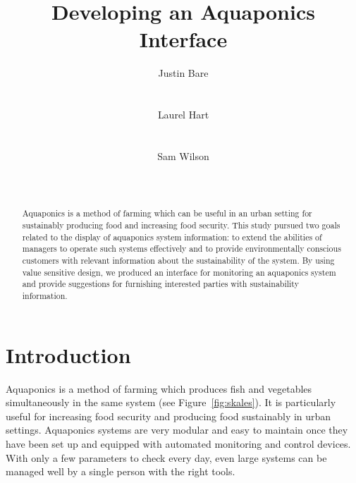 \documentclass{sigchi}
\begin{document}
\title{Developing an Aquaponics Interface}

\author{
  \alignauthor Justin Bare\\
    \\
    \\
  \alignauthor Laurel Hart\\
    \\
    \\
  \alignauthor Sam Wilson\\
    \\
    \\
}

\maketitle

\begin{abstract}
Aquaponics is a method of farming which can be useful in an urban setting for sustainably producing food and increasing food security. This study pursued two goals related to the display of aquaponics system information: to extend the abilities of managers to operate such systems effectively and to provide environmentally conscious customers with relevant information about the sustainability of the system. By using value sensitive design, we produced an interface for monitoring an aquaponics system and provide suggestions for furnishing interested parties with sustainability information.
\end{abstract}



\section{Introduction}

Aquaponics is a method of farming which produces fish and vegetables simultaneously in the same system (see Figure~\ref{fig:skales}). It is particularly useful for increasing food security and producing food sustainably in urban settings. Aquaponics systems are very modular and easy to maintain once they have been set up and equipped with automated monitoring and control devices. With only a few parameters to check every day, even large systems can be managed well by a single person with the right tools. 
\end{document}
